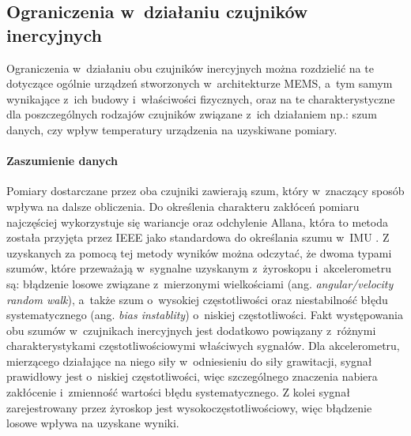 \subsection{Ograniczenia w~działaniu czujników inercyjnych}
Ograniczenia w~działaniu obu czujników inercyjnych można rozdzielić na te dotyczące ogólnie urządzeń stworzonych w~architekturze MEMS, a~tym samym wynikające z~ich budowy i~właściwości fizycznych, oraz na te charakterystyczne dla poszczególnych rodzajów czujników związane z~ich działaniem np.: szum danych, czy wpływ temperatury urządzenia na uzyskiwane pomiary.
																																															
\paragraph*{Zaszumienie danych}
Pomiary dostarczane przez oba czujniki zawierają szum, który w~znaczący sposób wpływa na dalsze obliczenia. Do określenia charakteru zakłóceń pomiaru najczęściej wykorzystuje się wariancje oraz odchylenie Allana\cite{Allan1966}, która to metoda została przyjęta przez IEEE jako standardowa do określania szumu w~IMU \cite{IeeeAccSpec}. Z uzyskanych za pomocą tej metody wyników można odczytać, że dwoma typami szumów, które przeważają w~sygnalne uzyskanym z~żyroskopu i~akcelerometru są: błądzenie losowe związane z~mierzonymi wielkościami (ang. \emph{angular/velocity random walk}), a~także szum o~wysokiej częstotliwości oraz niestabilność błędu systematycznego (ang. \emph{bias instablity}) o~niskiej częstotliwości. Fakt występowania obu szumów w~czujnikach inercyjnych jest dodatkowo powiązany z~różnymi charakterystykami częstotliwościowymi właściwych sygnałów. Dla akcelerometru, mierzącego działające na niego siły w~odniesieniu do siły grawitacji, sygnał prawidłowy jest o~niskiej częstotliwości, więc szczególnego znaczenia nabiera zakłócenie i~zmienność wartości błędu systematycznego. Z kolei sygnał zarejestrowany przez żyroskop jest wysokoczęstotliwościowy, więc błądzenie losowe wpływa na uzyskane wyniki.
																																															

